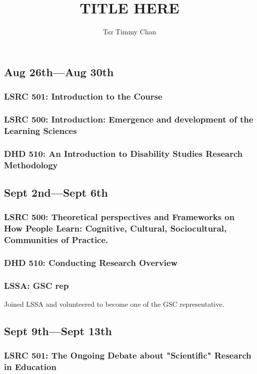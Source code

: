\documentclass{TC}
\title{TITLE HERE}	%
\author{Tsz Timmy Chan}	%
\begin{document}
\subsection{Aug 26th---Aug 30th}	
	\subsubsection{LSRC 501: Introduction to the Course}
	
	
	\subsubsection{LSRC 500: Introduction: Emergence and development of the Learning Sciences}	
	
	\subsubsection{DHD 510: An Introduction to Disability Studies Research Methodology}
	
	
	
\subsection{Sept 2nd---Sept 6th}
	\subsubsection{LSRC 500: Theoretical perspectives and Frameworks on How People Learn: Cognitive, Cultural, Sociocultural, Communities of Practice.}
	
	
	\subsubsection{DHD 510: Conducting Research Overview}
	
	
	\subsubsection{\gls{LSSA}: \gls{GSC} rep}
	Joined \gls{LSSA} and volunteered to become one of the \gls{GSC} representative.

\subsection{Sept 9th---Sept 13th}
	\subsubsection{LSRC 501: The Ongoing Debate about "Scientific" Research in Education}
	
	
\end{document}
